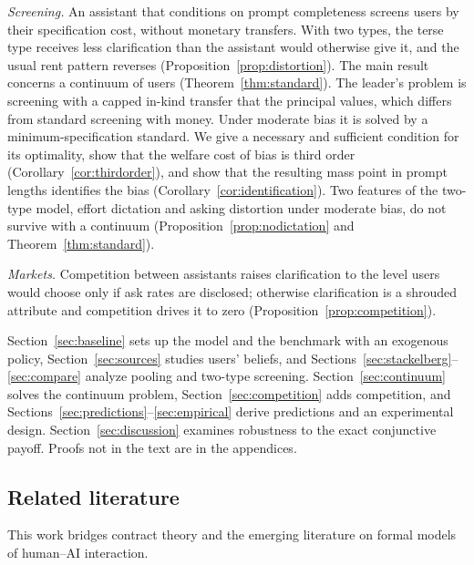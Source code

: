 \documentclass[11pt]{article}
\begin{document}
\emph{Screening.} An assistant that conditions on prompt completeness screens users by their specification cost, without monetary transfers. With two types, the terse type receives less clarification than the assistant would otherwise give it, and the usual rent pattern reverses (Proposition~\ref{prop:distortion}). The main result concerns a continuum of users (Theorem~\ref{thm:standard}). The leader's problem is screening with a capped in-kind transfer that the principal values, which differs from standard screening with money. Under moderate bias it is solved by a minimum-specification standard. We give a necessary and sufficient condition for its optimality, show that the welfare cost of bias is third order (Corollary~\ref{cor:thirdorder}), and show that the resulting mass point in prompt lengths identifies the bias (Corollary~\ref{cor:identification}). Two features of the two-type model, effort dictation and asking distortion under moderate bias, do not survive with a continuum (Proposition~\ref{prop:nodictation} and Theorem~\ref{thm:standard}).

\emph{Markets.} Competition between assistants raises clarification to the level users would choose only if ask rates are disclosed; otherwise clarification is a shrouded attribute and competition drives it to zero (Proposition~\ref{prop:competition}).

Section~\ref{sec:baseline} sets up the model and the benchmark with an exogenous policy, Section~\ref{sec:sources} studies users' beliefs, and Sections~\ref{sec:stackelberg}--\ref{sec:compare} analyze pooling and two-type screening. Section~\ref{sec:continuum} solves the continuum problem, Section~\ref{sec:competition} adds competition, and Sections~\ref{sec:predictions}--\ref{sec:empirical} derive predictions and an experimental design. Section~\ref{sec:discussion} examines robustness to the exact conjunctive payoff. Proofs not in the text are in the appendices.

\subsection{Related literature}

This work bridges contract theory and the emerging literature on formal models of human--AI interaction.
\end{document}
